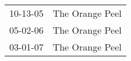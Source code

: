 \begin{supertabular}{p{0.07\textwidth}p{0.23\textwidth}}
 10-13-05 &  The Orange Peel \\
 05-02-06 &  The Orange Peel \\
 03-01-07 &  The Orange Peel \\
\end{supertabular}
